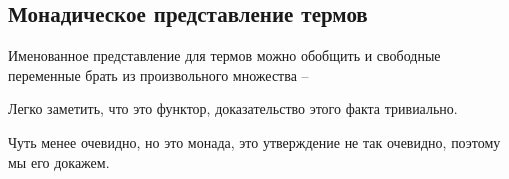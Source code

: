 \subsection{Монадическое представление термов}

Именованное представление для термов можно обобщить и свободные переменные брать из произвольного множества -- \cite{bird1999bruijn}

Легко заметить, что это функтор, доказательство этого факта тривиально.

Чуть менее очевидно, но это монада, это утверждение не так очевидно, поэтому мы его докажем.
